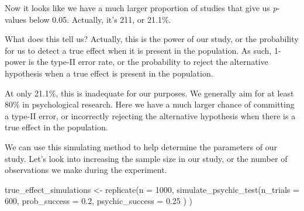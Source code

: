 \documentclass[
]{book}
\newenvironment{Shaded}{\begin{snugshade}}{\end{snugshade}}
\newcommand{\AttributeTok}[1]{\textcolor[rgb]{0.77,0.63,0.00}{#1}}
\newcommand{\DecValTok}[1]{\textcolor[rgb]{0.00,0.00,0.81}{#1}}
\newcommand{\FloatTok}[1]{\textcolor[rgb]{0.00,0.00,0.81}{#1}}
\newcommand{\FunctionTok}[1]{\textcolor[rgb]{0.00,0.00,0.00}{#1}}
\newcommand{\NormalTok}[1]{#1}
\newcommand{\OtherTok}[1]{\textcolor[rgb]{0.56,0.35,0.01}{#1}}
\begin{document}
Now it looks like we have a much larger proportion of studies that give us \emph{p}-values below 0.05. Actually, it's 211, or 21.1\%.

What does this tell us? Actually, this is the power of our study, or the probability for us to detect a true effect when it is present in the population. As such, 1-power is the type-II error rate, or the probability to reject the alternative hypothesis when a true effect is present in the population.

At only 21.1\%, this is inadequate for our purposes. We generally aim for at least 80\% in psychological research. Here we have a much larger chance of committing a type-II error, or incorrectly rejecting the alternative hypothesis when there is a true effect in the population.

We can use this simulating method to help determine the parameters of our study. Let's look into increasing the sample size in our study, or the number of observations we make during the experiment.

\begin{Shaded}
\begin{Highlighting}[]
\NormalTok{true\_effect\_simulations }\OtherTok{\textless{}{-}} \FunctionTok{replicate}\NormalTok{(}\AttributeTok{n =} \DecValTok{1000}\NormalTok{, }
                         \FunctionTok{simulate\_psychic\_test}\NormalTok{(}\AttributeTok{n\_trials =} \DecValTok{600}\NormalTok{, }
                                               \AttributeTok{prob\_success =} \FloatTok{0.2}\NormalTok{,}
                                               \AttributeTok{psychic\_success =} \FloatTok{0.25}
\NormalTok{                                               )}
\NormalTok{                         )}
\end{Highlighting}
\end{Shaded}
\end{document}
